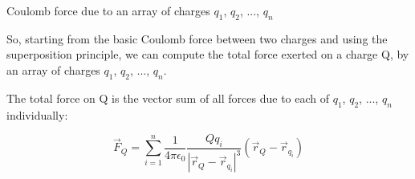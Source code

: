 %
%
%

\begin{frame}{Coulomb force due to an array of charges $q_1$, $q_2$, ..., $q_n$}

So, starting from the basic Coulomb force between two charges and using the superposition principle,
we can compute the total force exerted on a charge Q, by an array of charges $q_1$, $q_2$, ..., $q_n$.\\

\vspace{0.2cm}

The total force on Q is the vector sum of all forces due to each of $q_1$, $q_2$, ..., $q_n$ individually:

\begin{equation*}
   \vec{F}_{Q} = \sum_{i=1}^{n} \frac{1}{4\pi\epsilon_0}
       \frac{Q q_i}{|\vec{r}_{Q}-\vec{r}_{q_{i}}|^{3}} (\vec{r}_{Q}-\vec{r}_{q_{i}})
\end{equation*}

\end{frame}

%
%

